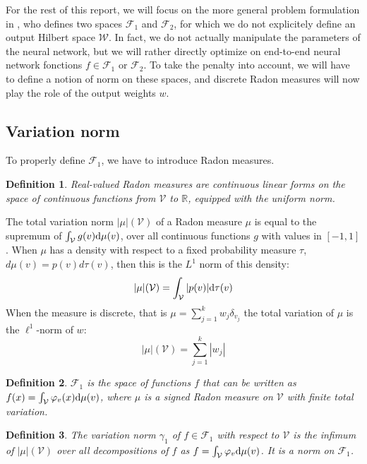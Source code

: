 \documentclass[a4paper, 11pt]{scrartcl}
\newtheorem{definition}{Definition}[section]
\begin{document}
{For the rest of this report, we will focus on the more general problem formulation in \cite{bach2017breaking}, who defines two spaces $\mathcal{F}_1$ and $\mathcal{F}_2$, for which we do not explicitely define an output Hilbert space $\mathcal{W}$. In fact, we do not actually manipulate the parameters of the neural network, but we will rather directly optimize on end-to-end neural network fonctions $f \in \mathcal{F}_1$ or $\mathcal{F}_2$. To take the penalty into account, we will have to define a notion of norm on these spaces, and discrete Radon measures will now play the role of the output weights $w$.

\subsection{Variation norm}

To properly define $\mathcal{F}_1$, we have to introduce Radon measures.

\begin{definition}
Real-valued Radon measures are continuous linear forms on the space of continuous functions from $\mathcal{V}$ to $\mathbb{R}$, equipped with the uniform norm.
\end{definition}

The total variation norm $|\mu|(\mathcal{V})$ of a Radon measure $\mu$  is equal to the supremum of $\int_\mathcal{V} g(v)\textnormal{d}\mu(v)$, over all continuous functions $g$ with values in $[-1, 1]$. When $\mu$ has a density with respect to a fixed probability measure $\tau$, ${d}\mu(v) = p(v) {d}\tau(v)$, then this is the $L^1$ norm of this density: $$|\mu|(\mathcal{V}) = \int_\mathcal{V} |p(v)| \textnormal{d}\tau(v)$$
When the measure is discrete, that is $\mu = \sum_{j=1}^k w_j \delta_{v_j}$ the total variation of $\mu$ is the $\ell^1$-norm of $w$:
$$|\mu|(\mathcal{V}) = \sum_{j=1}^k |w_j|  $$

\begin{definition}
$\mathcal{F}_1$ is the space of functions $f$ that can be written as
$f(x)= \int_\mathcal{V} \varphi_v(x)\textnormal{d}\mu(v)$,
where $\mu$ is a signed Radon measure on $\mathcal{V}$ with finite total variation.
\end{definition}

\begin{definition}
The variation norm $\gamma_1$ of $f \in \mathcal{F}_1$ with respect to $\mathcal{V}$ is the infimum of $|\mu|(\mathcal{V})$ over all decompositions of $f$ as $f= \int_\mathcal{V} \varphi_v\textnormal{d}\mu(v)$. It is a norm on $\mathcal{F}_1$.
\end{definition}

}
\end{document}
